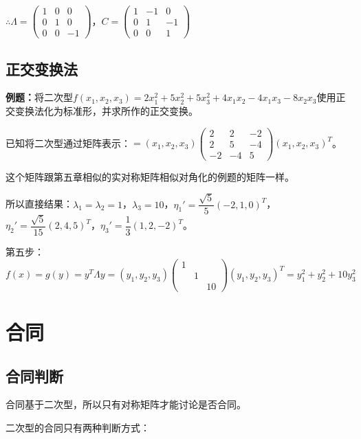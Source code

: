 \documentclass[UTF8, 12pt]{ctexart}
\begin{document}
$\therefore\Lambda=\left(\begin{array}{ccc}
    1 & 0 & 0 \\
    0 & 1 & 0 \\
    0 & 0 & -1
\end{array}\right)$，$C=\left(\begin{array}{ccc}
    1 & -1 & 0 \\
    0 & 1 & -1 \\
    0 & 0 & 1
\end{array}\right)$

\subsection{正交变换法}

\textbf{例题：}将二次型$f(x_1,x_2,x_3)=2x_1^2+5x_2^2+5x_3^2+4x_1x_2-4x_1x_3-8x_2x_3$使用正交变换法化为标准形，并求所作的正交变换。

已知将二次型通过矩阵表示：$=(x_1,x_2,x_3)\left(\begin{array}{ccc}
    2 & 2 & -2 \\
    2 & 5 & -4 \\
    -2 & -4 & 5
\end{array}\right)(x_1,x_2,x_3)^T$。\medskip

这个矩阵跟第五章相似的实对称矩阵相似对角化的例题的矩阵一样。

所以直接结果：$\lambda_1=\lambda_2=1$，$\lambda_3=10$，$\eta_1'=\dfrac{\sqrt{5}}{5}(-2,1,0)^T$，$\eta_2'=\dfrac{\sqrt{5}}{15}(2,4,5)^T$，$\eta_3'=\dfrac{1}{3}(1,2,-2)^T$。

第五步：$f(x)=g(y)=y^T\Lambda y=(y_1,y_2,y_3)\left(\begin{array}{ccc}
    1 \\
     & 1 \\
     & & 10
\end{array}\right)(y_1,y_2,y_3)^T=y_1^2+y_2^2+10y_3^2$

\section{合同}

\subsection{合同判断}

合同基于二次型，所以只有对称矩阵才能讨论是否合同。

二次型的合同只有两种判断方式：
\end{document}
